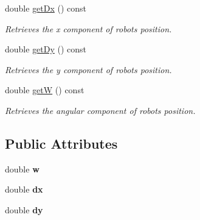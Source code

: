 \begin{DoxyCompactItemize}
double \hyperlink{classrigid2d_1_1Twist2D_a1858b9ff8ceefd361a948fab83860ebe}{get\+Dx} () const
\begin{DoxyCompactList}\small\item\em Retrieves the x component of robot\textquotesingle{}s position. \end{DoxyCompactList}\item 
double \hyperlink{classrigid2d_1_1Twist2D_aff295b650a5b848b74ab5d15436efb8a}{get\+Dy} () const
\begin{DoxyCompactList}\small\item\em Retrieves the y component of robot\textquotesingle{}s position. \end{DoxyCompactList}\item 
double \hyperlink{classrigid2d_1_1Twist2D_abf67b8c02aad46cdcd83936037e1c99a}{getW} () const
\begin{DoxyCompactList}\small\item\em Retrieves the angular component of robot\textquotesingle{}s position. \end{DoxyCompactList}\end{DoxyCompactItemize}
\subsection*{Public Attributes}
\begin{DoxyCompactItemize}
\item 
\mbox{\label{classrigid2d_1_1Twist2D_a51cf04849d5dee162f9f5c2b208d97c7}} 
double {\bfseries w}
\item 
\mbox{\label{classrigid2d_1_1Twist2D_a9819a1a827432b65e4f7f82a3a52979f}} 
double {\bfseries dx}
\item 
\mbox{\label{classrigid2d_1_1Twist2D_a4d4b0d68d3d7847c702def808c90fab7}} 
double {\bfseries dy}
\end{DoxyCompactItemize}

